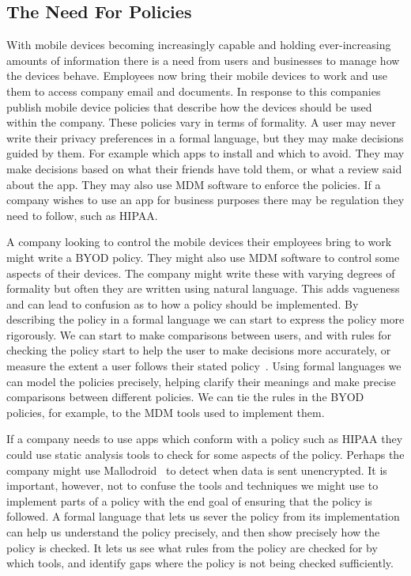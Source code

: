\documentclass[thesis.tex]{subfiles}
\begin{document}
\subsection{The Need For Policies}

With mobile devices becoming increasingly capable and holding
ever-increasing amounts of information there is a need from users and
businesses to manage how the devices behave.  Employees now bring
their mobile devices to work and use them to access company email and
documents.  In response to this companies publish mobile device
policies that describe how the devices should be used within the
company.  These policies vary in terms of formality.  A user may never
write their privacy preferences in a formal language, but they may
make decisions guided by them.  For example which apps to install and
which to avoid.  They may make decisions based on what their friends
have told them, or what a review said about the app.  They may also
use \ac{MDM} software to enforce the policies.  If a company wishes to
use an app for business purposes there may be regulation they need to
follow, such as \ac{HIPAA}.

A company looking to control the mobile devices their employees bring
to work might write a \ac{BYOD} policy.  They might also use \ac{MDM}
software to control some aspects of their devices.  The company might
write these with varying degrees of formality but often they are
written using natural language.  This adds vagueness and can lead to
confusion as to how a policy should be implemented.  By describing the
policy in a formal language we can start to express the policy more
rigorously.  We can start to make comparisons between users, and with
rules for checking the policy start to help the user to make decisions
more accurately, or measure the extent a user follows their stated
policy~\cite{hallett_apppal_2016}.  Using formal languages we can
model the policies precisely, helping clarify their meanings and make
precise comparisons between different policies.  We can tie the rules
in the \ac{BYOD} policies, for example, to the \ac{MDM} tools used to
implement them.

If a company needs to use apps which conform with a policy such as
\ac{HIPAA} they could use static analysis tools to check for some
aspects of the policy.  Perhaps the company might use
Mallodroid~\cite{fahl_why_2012} to detect when data is sent
unencrypted.  It is important, however, not to confuse the tools and
techniques we might use to implement parts of a policy with the end
goal of ensuring that the policy is followed.  A formal language that
lets us sever the policy from its implementation can help us
understand the policy precisely, and then show precisely how the
policy is checked.  It lets us see what rules from the policy are
checked for by which tools, and identify gaps where the policy is not
being checked sufficiently.
\end{document}
